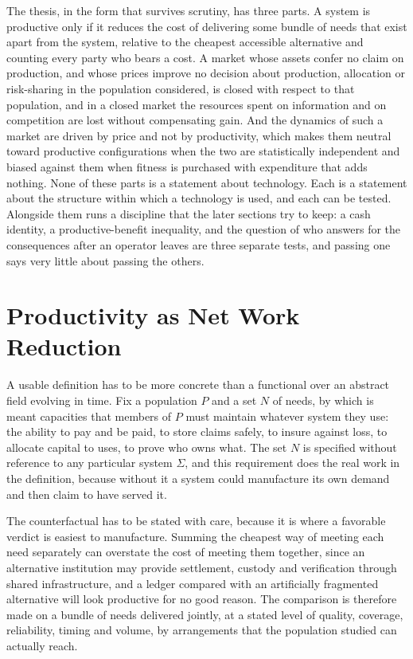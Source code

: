 \documentclass[11pt]{article}
\theoremstyle{remark}
\begin{document}
The thesis, in the form that survives scrutiny, has three parts. A system is productive only if it reduces the cost of delivering some bundle of needs that exist apart from the system, relative to the cheapest accessible alternative and counting every party who bears a cost. A market whose assets confer no claim on production, and whose prices improve no decision about production, allocation or risk-sharing in the population considered, is closed with respect to that population, and in a closed market the resources spent on information and on competition are lost without compensating gain. And the dynamics of such a market are driven by price and not by productivity, which makes them neutral toward productive configurations when the two are statistically independent and biased against them when fitness is purchased with expenditure that adds nothing. None of these parts is a statement about technology. Each is a statement about the structure within which a technology is used, and each can be tested. Alongside them runs a discipline that the later sections try to keep: a cash identity, a productive-benefit inequality, and the question of who answers for the consequences after an operator leaves are three separate tests, and passing one says very little about passing the others.

\section{Productivity as Net Work Reduction}\label{sec:productivity}

A usable definition has to be more concrete than a functional over an abstract field evolving in time. Fix a population $P$ and a set $N$ of needs, by which is meant capacities that members of $P$ must maintain whatever system they use: the ability to pay and be paid, to store claims safely, to insure against loss, to allocate capital to uses, to prove who owns what. The set $N$ is specified without reference to any particular system $\Sigma$, and this requirement does the real work in the definition, because without it a system could manufacture its own demand and then claim to have served it.

The counterfactual has to be stated with care, because it is where a favorable verdict is easiest to manufacture. Summing the cheapest way of meeting each need separately can overstate the cost of meeting them together, since an alternative institution may provide settlement, custody and verification through shared infrastructure, and a ledger compared with an artificially fragmented alternative will look productive for no good reason. The comparison is therefore made on a bundle of needs delivered jointly, at a stated level of quality, coverage, reliability, timing and volume, by arrangements that the population studied can actually reach.
\end{document}
